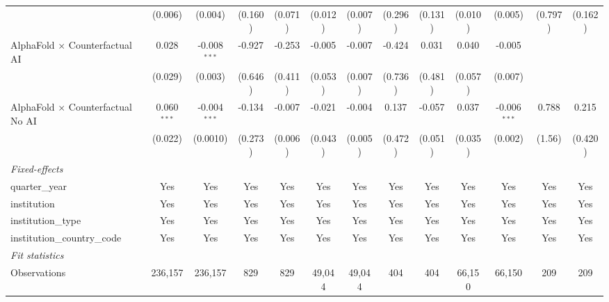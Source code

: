 \begin{tabular}{lcccccccccccc}
                                            & (0.006)       & (0.004)        & (0.160)       & (0.071)       & (0.012)       & (0.007)       & (0.296)     & (0.131) & (0.010)       & (0.005)        & (0.797) & (0.162)\\   
   AlphaFold $\times$ Counterfactual AI     & 0.028         & -0.008$^{***}$ & -0.927        & -0.253        & -0.005        & -0.007        & -0.424      & 0.031   & 0.040         & -0.005         &         &   \\   
                                            & (0.029)       & (0.003)        & (0.646)       & (0.411)       & (0.053)       & (0.007)       & (0.736)     & (0.481) & (0.057)       & (0.007)        &         &   \\   
   AlphaFold $\times$ Counterfactual No AI  & 0.060$^{***}$ & -0.004$^{***}$ & -0.134        & -0.007        & -0.021        & -0.004        & 0.137       & -0.057  & 0.037         & -0.006$^{***}$ & 0.788   & 0.215\\   
                                            & (0.022)       & (0.0010)       & (0.273)       & (0.006)       & (0.043)       & (0.005)       & (0.472)     & (0.051) & (0.035)       & (0.002)        & (1.56)  & (0.420)\\   
   \midrule
   \emph{Fixed-effects}\\
   quarter\_year                            & Yes           & Yes            & Yes           & Yes           & Yes           & Yes           & Yes         & Yes     & Yes           & Yes            & Yes     & Yes\\  
   institution                              & Yes           & Yes            & Yes           & Yes           & Yes           & Yes           & Yes         & Yes     & Yes           & Yes            & Yes     & Yes\\  
   institution\_type                        & Yes           & Yes            & Yes           & Yes           & Yes           & Yes           & Yes         & Yes     & Yes           & Yes            & Yes     & Yes\\  
   institution\_country\_code               & Yes           & Yes            & Yes           & Yes           & Yes           & Yes           & Yes         & Yes     & Yes           & Yes            & Yes     & Yes\\  
   \midrule
   \emph{Fit statistics}\\
   Observations                             & 236,157       & 236,157        & 829           & 829           & 49,044        & 49,044        & 404         & 404     & 66,150        & 66,150         & 209     & 209\\  

\end{tabular}
